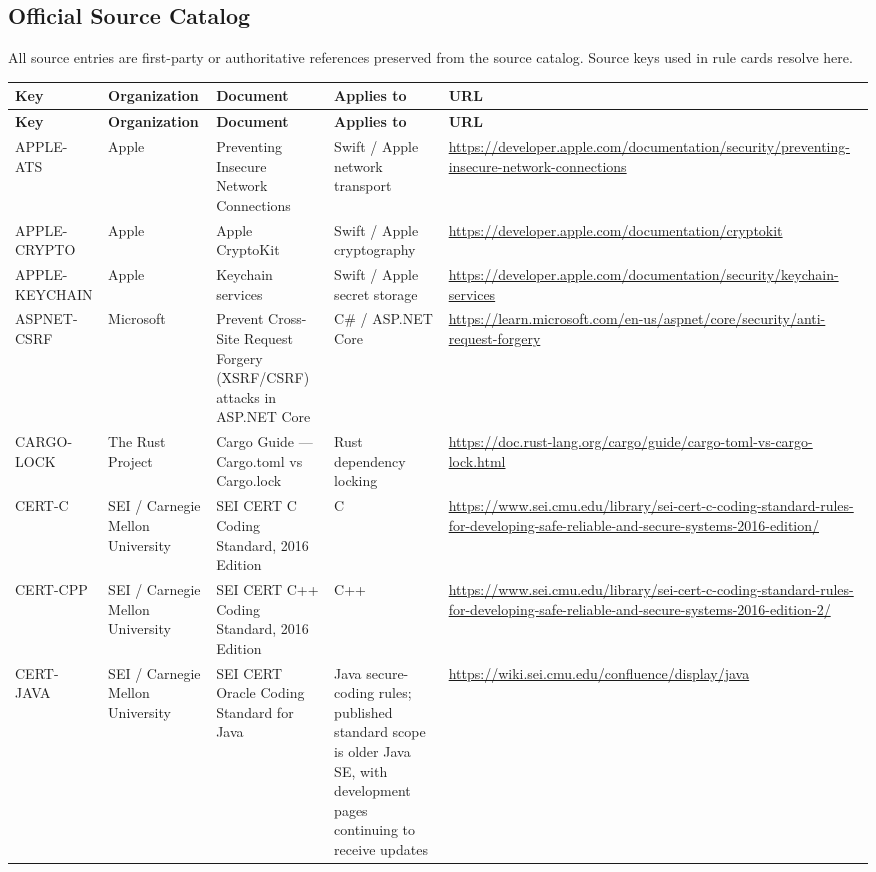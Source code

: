 \documentclass[10pt,letterpaper]{article}
\begin{document}
\begin{landscape}
\section{Official Source Catalog}
All source entries are first-party or authoritative references preserved from the source catalog. Source keys used in rule cards resolve here.

\scriptsize
\setlength{\tabcolsep}{3pt}
\begin{longtable}{@{}P{0.82in}P{1.23in}P{2.25in}P{1.7in}P{3.0in}@{}}
\toprule
\textbf{Key} & \textbf{Organization} & \textbf{Document} & \textbf{Applies to} & \textbf{URL}\\
\midrule
\endfirsthead
\toprule
\textbf{Key} & \textbf{Organization} & \textbf{Document} & \textbf{Applies to} & \textbf{URL}\\
\midrule
\endhead
APPLE-ATS & Apple & Preventing Insecure Network Connections & Swift / Apple network transport & \url{https://developer.apple.com/documentation/security/preventing-insecure-network-connections}\\
APPLE-CRYPTO & Apple & Apple CryptoKit & Swift / Apple cryptography & \url{https://developer.apple.com/documentation/cryptokit}\\
APPLE-KEYCHAIN & Apple & Keychain services & Swift / Apple secret storage & \url{https://developer.apple.com/documentation/security/keychain-services}\\
ASPNET-CSRF & Microsoft & Prevent Cross-Site Request Forgery (XSRF/CSRF) attacks in ASP.NET Core & C\# / ASP.NET Core & \url{https://learn.microsoft.com/en-us/aspnet/core/security/anti-request-forgery}\\
CARGO-LOCK & The Rust Project & Cargo Guide --- Cargo.toml vs Cargo.lock & Rust dependency locking & \url{https://doc.rust-lang.org/cargo/guide/cargo-toml-vs-cargo-lock.html}\\
CERT-C & SEI / Carnegie Mellon University & SEI CERT C Coding Standard, 2016 Edition & C & \url{https://www.sei.cmu.edu/library/sei-cert-c-coding-standard-rules-for-developing-safe-reliable-and-secure-systems-2016-edition/}\\
CERT-CPP & SEI / Carnegie Mellon University & SEI CERT C++ Coding Standard, 2016 Edition & C++ & \url{https://www.sei.cmu.edu/library/sei-cert-c-coding-standard-rules-for-developing-safe-reliable-and-secure-systems-2016-edition-2/}\\
CERT-JAVA & SEI / Carnegie Mellon University & SEI CERT Oracle Coding Standard for Java & Java secure-coding rules; published standard scope is older Java SE, with development pages continuing to receive updates & \url{https://wiki.sei.cmu.edu/confluence/display/java}\\

\end{longtable}
\end{landscape}
\end{document}
